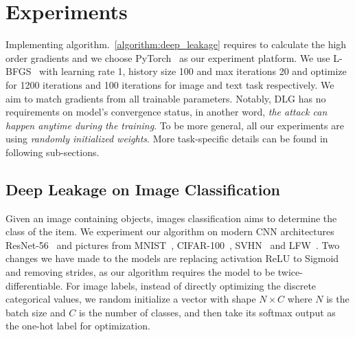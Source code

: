 \section{Experiments}\label{sec:experiments}





Implementing algorithm.~\ref{algorithm:deep_leakage} requires to calculate the high order gradients and we choose PyTorch~\cite{paszke2017pytorch} as our experiment platform. 
We use L-BFGS~\cite{liu1989lbfgs} with learning rate 1, history size 100 and max iterations 20 and optimize for 1200 iterations and 100 iterations for image and text task respectively. We aim to match gradients from all trainable parameters. Notably,
DLG has no requirements on model's convergence status, in another word, \textit{the attack can happen anytime during the training}. To be more general, all our experiments are using \textit{randomly initialized weights}. More task-specific details can be found in following sub-sections. 

\subsection{Deep Leakage on Image Classification}
\label{sec:experiments_vision}

Given an image containing objects, images classification aims to determine the class of the item. We experiment our algorithm on modern CNN architectures ResNet-56~\cite{he2016deep} and pictures from MNIST~\cite{lecun1998mnist}, CIFAR-100~\cite{krizhevsky2009cifar}, SVHN~\cite{netzer2011svhn} and LFW~\cite{LFWTech}. Two changes we have made to the models are replacing activation ReLU to Sigmoid and removing strides, as our algorithm requires the model to be twice-differentiable. For image labels, instead of directly optimizing the discrete categorical values, we random initialize a vector with shape $N \times C$ where $N$ is the batch size and $C$ is the number of classes, and then take its softmax output as the one-hot label for optimization.


